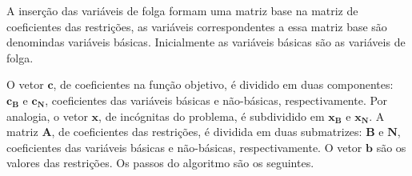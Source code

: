 A inserção das variáveis de folga formam uma matriz base na matriz de coeficientes das restrições, as variáveis correspondentes a essa matriz base são denomindas variáveis básicas. Inicialmente as variáveis básicas são as variáveis de folga.

O vetor $\mathbf{c}$, de coeficientes na função objetivo, é dividido em duas componentes: $\mathbf{c{_B}}$ e $\mathbf{c{_N}}$, coeficientes das variáveis básicas e não-básicas, respectivamente. Por analogia, o vetor $\mathbf{x}$, de incógnitas do problema, é subdividido em $\mathbf{x{_B}}$ e $\mathbf{x{_N}}$.  A matriz $\mathbf{A}$, de coeficientes das restrições, é dividida em duas submatrizes: $\mathbf{B}$ e $\mathbf{N}$, coeficientes das variáveis básicas e não-básicas, respectivamente. O vetor $\textbf{b}$ são os valores das restrições. Os passos do algoritmo são os seguintes.\\

